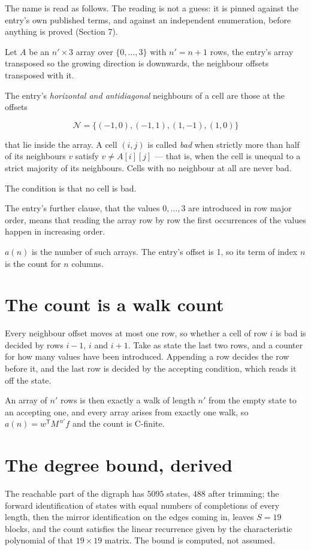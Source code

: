 \documentclass[11pt]{article}
\theoremstyle{definition}
\begin{document}
The name is read as follows. The reading is not a guess: it is pinned against the entry's own published terms, and against an independent enumeration, before anything is proved (Section 7).

Let $A$ be an $n' \times 3$ array over $\{0,\dots,3\}$ with $n' = n + 1$ rows, the entry's array transposed so the growing direction is downwards, the neighbour offsets transposed with it.

The entry's {\itshape horizontal and antidiagonal} neighbours of a cell are those at the offsets

\[\mathcal{N} = \{(-1,0), (-1,1), (1,-1), (1,0)\}\]

that lie inside the array. A cell $(i,j)$ is called {\itshape bad} when strictly more than half of its neighbours $v$ satisfy $v \ne A[i][j]$ --- that is, when the cell is unequal to a strict majority of its neighbours. Cells with no neighbour at all are never bad.

The condition is that no cell is bad.

The entry's further clause, that the values $0,\dots,3$ are introduced in row major order, means that reading the array row by row the first occurrences of the values happen in increasing order.

$a(n)$ is the number of such arrays. The entry's offset is 1, so its term of index $n$ is the count for $n$ columns.

\section{The count is a walk count}

Every neighbour offset moves at most one row, so whether a cell of row $i$ is bad is decided by rows $i-1$, $i$ and $i+1$. Take as state the last two rows, and a counter for how many values have been introduced. Appending a row decides the row before it, and the last row is decided by the accepting condition, which reads it off the state.

An array of $n'$ rows is then exactly a walk of length $n'$ from the empty state to an accepting one, and every array arises from exactly one walk, so $a(n) = w^{\mathsf T}M^{\,n'}f$ and the count is C-finite.

\section{The degree bound, derived}

The reachable part of the digraph has $5095$ states, $488$ after trimming; the forward identification of states with equal numbers of completions of every length, then the mirror identification on the edges coming in, leaves $S = 19$ blocks, and the count satisfies the linear recurrence given by the characteristic polynomial of that $19\times19$ matrix. The bound is computed, not assumed.
\end{document}

